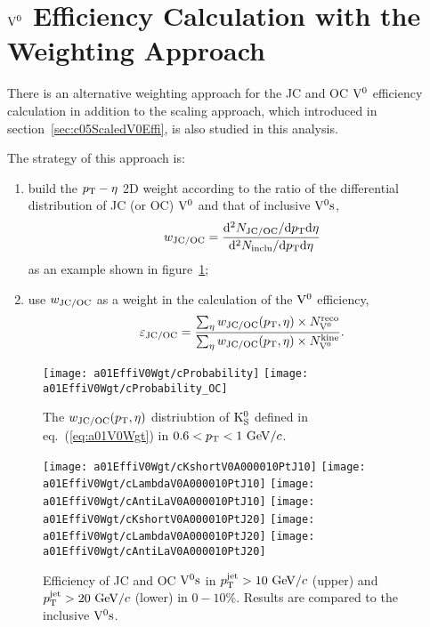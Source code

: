 \section{${\rm V}^{0}$ Efficiency Calculation with the Weighting Approach}
\label{sec:a01WghtV0Effi}

There is an alternative weighting approach for the JC and OC ${\rm V}^{0}$
efficiency calculation in addition to the scaling approach,
which introduced in section~\ref{sec:c05ScaledV0Effi},
is also studied in this analysis.

The strategy of this approach is:
\begin{enumerate}
\item build the $p_{\rm T}-\eta$ 2D weight according to the ratio of the
      differential distribution of JC (or OC) ${\rm V}^{0}$ and that of
      inclusive ${\rm V}^{0}{\rm s}$,
      \begin{equation}
      w_{\rm JC/OC}=\frac{{\rm d}^{2}N_{\rm JC/OC}/{\rm d}p_{\rm T}{\rm d}\eta}
                         {{\rm d}^{2}N_{\rm inclu}/{\rm d}p_{\rm T}{\rm d}\eta}
      \end{equation}
      as an example shown in figure~\ref{fig:a01V0ProbWgt};
\item use $w_{\rm JC/OC}$ as a weight in the calculation of the ${\rm V}^{0}$
      efficiency,
      \begin{equation}
      \varepsilon_{\rm JC/OC}=
      \frac{\sum_{\eta}w_{\rm JC/OC}(p_{\rm T},\eta)\times N_{{\rm V}^{0}}^{\rm reco}}
           {\sum_{\eta}w_{\rm JC/OC}(p_{\rm T},\eta)\times N_{{\rm V}^{0}}^{\rm kine}}.
\end{equation}
\end{enumerate}

\begin{figure}[htb]
\begin{center}
\texttt{[image: a01EffiV0Wgt/cProbability]}
\texttt{[image: a01EffiV0Wgt/cProbability\_OC]}
\caption{The $w_{\rm JC/OC}(p_{\rm T},\eta)$ distriubtion of ${\rm K}_{\rm S}^{0}$
         defined in eq.~(\ref{eq:a01V0Wgt}) in $0.6<p_{\rm T}<1~{\rm GeV}/c$.}
\label{fig:a01V0ProbWgt}
\end{center}
\end{figure}

\begin{figure}[htb]
\begin{center}
\texttt{[image: a01EffiV0Wgt/cKshortV0A000010PtJ10]}
\texttt{[image: a01EffiV0Wgt/cLambdaV0A000010PtJ10]}
\texttt{[image: a01EffiV0Wgt/cAntiLaV0A000010PtJ10]}
\texttt{[image: a01EffiV0Wgt/cKshortV0A000010PtJ20]}
\texttt{[image: a01EffiV0Wgt/cLambdaV0A000010PtJ20]}
\texttt{[image: a01EffiV0Wgt/cAntiLaV0A000010PtJ20]}
\caption{Efficiency of JC and OC ${\rm V}^{0}{\rm s}$ in $p_{\rm T}^{\rm jet}>10~{\rm GeV}/c$ (upper)
         and $p_{\rm T}^{\rm jet}>20~{\rm GeV}/c$ (lower) in $0-10\%$.
         Results are compared to the inclusive ${\rm V}^{0}{\rm s}$.}
\label{fig:a01EffiJEV0s000010}
\end{center}
\end{figure}

